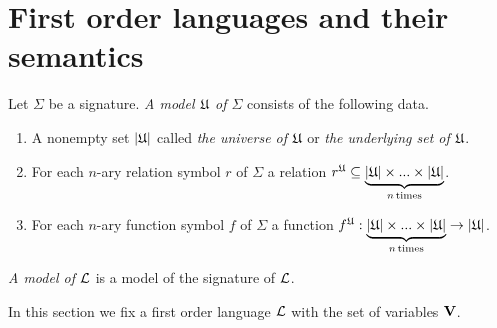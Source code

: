 \section{First order languages and their semantics}

\begin{definition}
Let $\Sigma$ be a signature. \textit{A model ${\mathfrak U}$ of $\Sigma$} consists of the following data.
\begin{enumerate}[label=\textbf{(\arabic*)}, leftmargin=3.0em]
\item A nonempty set $|{\mathfrak U}|$ called \textit{the universe of ${\mathfrak U}$} or \textit{the underlying set of ${\mathfrak U}$}.
\item For each $n$-ary relation symbol $r$ of $\Sigma$ a relation $r^{\mathfrak U} \subseteq \underbrace{|{\mathfrak U}| \times ... \times |{\mathfrak U}|}_{n\,\mathrm{times}}$.
\item For each $n$-ary function symbol $f$ of $\Sigma$ a function $f^{\mathfrak U}:\underbrace{|{\mathfrak U}| \times ... \times |{\mathfrak U}|}_{n\,\mathrm{times}} \rightarrow |{\mathfrak U}|$.
\end{enumerate}
\textit{A model of ${\mathcal L}$} is a model of the signature of ${\mathcal L}$.
\end{definition}
\noindent
In this section we fix a first order language ${\mathcal L}$ with the set of variables $\mathbf{V}$.

